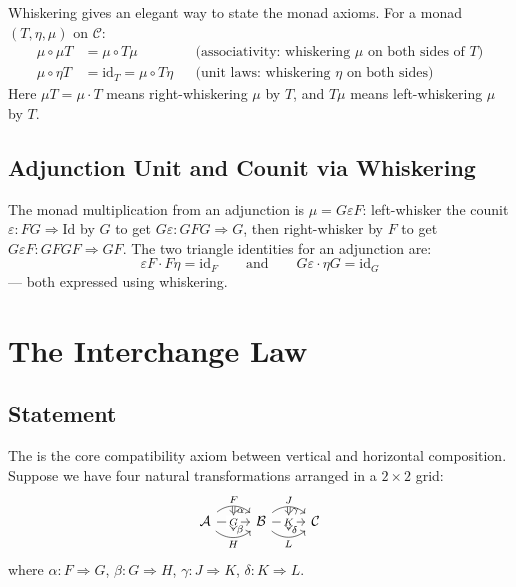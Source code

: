 Whiskering gives an elegant way to state the monad axioms. For a monad
$(T, \eta, \mu)$ on $\mathcal{C}$:
\begin{align*}
  \mu \circ \mu T &= \mu \circ T\mu
    & &\text{(associativity: whiskering $\mu$ on both sides of $T$)} \\
  \mu \circ \eta T &= \mathrm{id}_T = \mu \circ T\eta
    & &\text{(unit laws: whiskering $\eta$ on both sides)}
\end{align*}
Here $\mu T = \mu \cdot T$ means right-whiskering $\mu$ by $T$, and
$T\mu$ means left-whiskering $\mu$ by $T$.

\subsection{Adjunction Unit and Counit via Whiskering}

The monad multiplication from an adjunction is $\mu = G\varepsilon F$:
left-whisker the counit $\varepsilon : FG \Rightarrow \mathrm{Id}$ by $G$
to get $G\varepsilon: GFG \Rightarrow G$, then right-whisker by $F$ to
get $G\varepsilon F : GFGF \Rightarrow GF$. The two triangle identities
for an adjunction are:
\[
  \varepsilon F \cdot F\eta = \mathrm{id}_F
  \qquad \text{and} \qquad
  G\varepsilon \cdot \eta G = \mathrm{id}_G
\]
--- both expressed using whiskering.


\section{The Interchange Law}
\label{sec:interchange}

\subsection{Statement}

The  is the core compatibility axiom between vertical
and horizontal composition. Suppose we have four natural transformations
arranged in a $2 \times 2$ grid:
\[
  \begin{tikzcd}
    \mathcal{A}
      \arrow[r, bend left=40, "F", ""{name=F1}]
      \arrow[r, "G"{description}, ""{name=G1, below}, ""{name=G2, above}]
      \arrow[r, bend right=40, "H"', ""{name=H1}]
    & \mathcal{B}
      \arrow[r, bend left=40, "J", ""{name=J1}]
      \arrow[r, "K"{description}, ""{name=K1, below}, ""{name=K2, above}]
      \arrow[r, bend right=40, "L"', ""{name=L1}]
    & \mathcal{C}
    \arrow[Rightarrow, from=F1, to=G2, "\alpha"]
    \arrow[Rightarrow, from=G1, to=H1, "\beta"]
    \arrow[Rightarrow, from=J1, to=K2, "\gamma"]
    \arrow[Rightarrow, from=K1, to=L1, "\delta"]
  \end{tikzcd}
\]
where $\alpha: F \Rightarrow G$, $\beta: G \Rightarrow H$,
$\gamma: J \Rightarrow K$, $\delta: K \Rightarrow L$.

